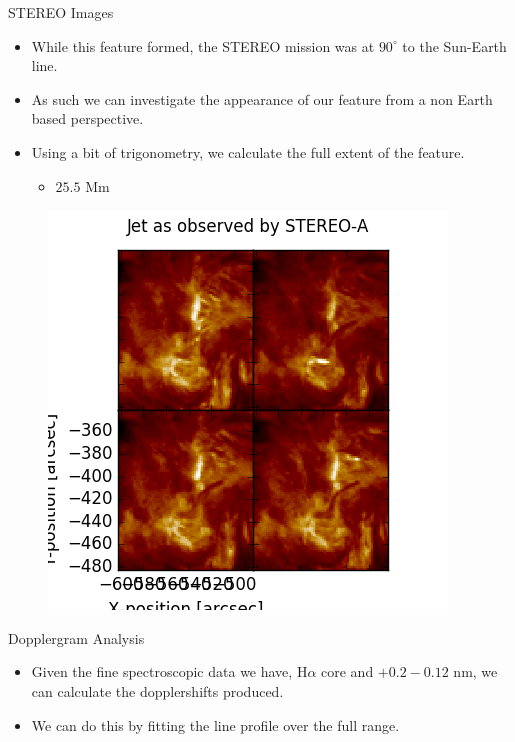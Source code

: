 \documentclass{beamer}
\begin{document}
	
	\begin{frame}{STEREO Images}
		\begin{itemize}
			\item{While this feature formed, the STEREO mission was at $90^\circ$ to the Sun-Earth line.}
			\item{As such we can investigate the appearance of our feature from a non Earth based perspective.}
			\item{Using a bit of trigonometry, we calculate the full extent of the feature.}
			\begin{itemize}
				\item{$\mathbf{25.5}$ Mm}
			\end{itemize}
		\end{itemize}
		\begin{figure}
			\includegraphics[scale=0.4]{Figs/STEREO-A.png}
		\end{figure}
	\end{frame}
	
	\begin{frame}{Dopplergram Analysis}
		\begin{itemize}
			\item{Given the fine spectroscopic data we have, H$\alpha$ core and $+0.2 -0.12$ nm, we can calculate the dopplershifts produced.}
			\item{We can do this by fitting the line profile over the full range.}
		\end{itemize}
	\end{frame}
	
\end{document}
